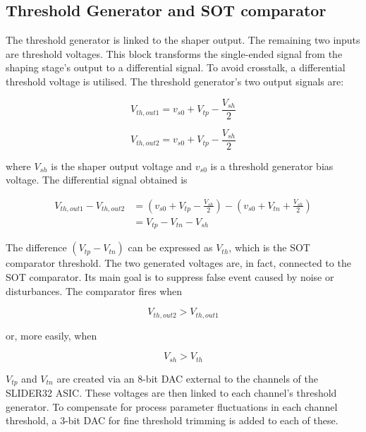 
\subsection{Threshold Generator and SOT comparator} \label{thrSOT}
The threshold generator is linked to the shaper output. The remaining two inputs are threshold voltages. This block transforms the single-ended signal from the shaping stage's output to a differential signal. To avoid crosstalk, a differential threshold voltage is utilised. The threshold generator's two output signals are:

\begin{equation}
    V_{th, out1} = v_{s0} + V_{tp} - \frac{V_{sh}}{2}
\end{equation}

\begin{equation}
    V_{th, out2} = v_{s0} + V_{tp} - \frac{V_{sh}}{2}
\end{equation}

\noindent
where $V_{sh}$ is the shaper output voltage and $v_{s0}$ is a threshold generator bias voltage. The differential signal obtained is

\begin{equation}
    \begin{split}
        V_{th, out1} - V_{th, out2} & = (v_{s0} + V_{tp} - \frac{V_{sh}}{2}) - (v_{s0} + V_{tn} + \frac{V_{sh}}{2}) \\
        & = V_{tp} - V_{tn} - V_{sh}
    \end{split}
\end{equation}

The difference $(V_{tp} - V_{tn})$ can be expressed as $V_{th}$, which is the SOT comparator threshold. The two generated voltages are, in fact, connected to the SOT comparator. Its main goal is to suppress false event caused by noise or disturbances. The comparator fires when

\begin{equation}
    V_{th, out2} > V_{th, out1}
\end{equation}

\noindent
or, more easily, when

\begin{equation}
    V_{sh} > V_{th}
\end{equation}

\noindent
$V_{tp}$ and $V_{tn}$ are created via an 8-bit DAC external to the channels of the SLIDER32 ASIC. These voltages are then linked to each channel's threshold generator. To compensate for process parameter fluctuations in each channel threshold, a 3-bit DAC for fine threshold trimming is added to each of these.


